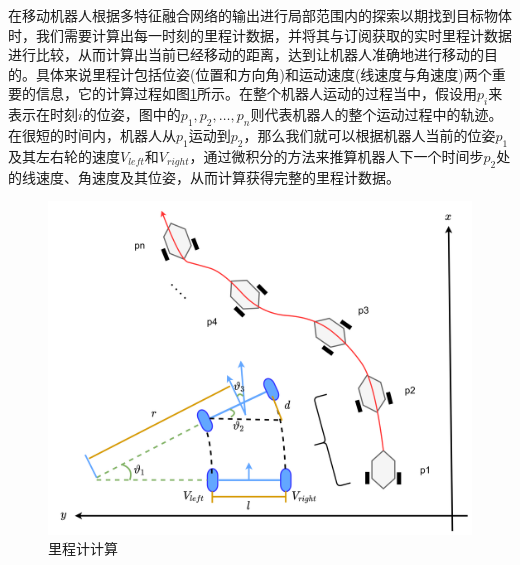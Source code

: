 在移动机器人根据多特征融合网络的输出进行局部范围内的探索以期找到目标物体时，我们需要计算出每一时刻的里程计数据，并将其与订阅获取的实时里程计数据进行比较，从而计算出当前已经移动的距离，达到让机器人准确地进行移动的目的。具体来说里程计包括位姿(位置和方向角)和运动速度(线速度与角速度)两个重要的信息，它的计算过程如图\ref{motion_calculate}所示。在整个机器人运动的过程当中，假设用${p_i}$来表示在时刻$i$的位姿，图中的${p_1},{p_2}, \ldots ,{p_n}$则代表机器人的整个运动过程中的轨迹。在很短的时间内，机器人从${p_1}$运动到${p_2}$，那么我们就可以根据机器人当前的位姿${p_1}$及其左右轮的速度${V_{left}}$和${V_{right}}$，通过微积分的方法来推算机器人下一个时间步${p_2}$处的线速度、角速度及其位姿，从而计算获得完整的里程计数据。
\begin{figure}[htbp]
    \centering
    \includegraphics[scale=0.05]{Fig/移动控制.png}
    \caption{\label{motion_calculate}里程计计算}
\end{figure}


